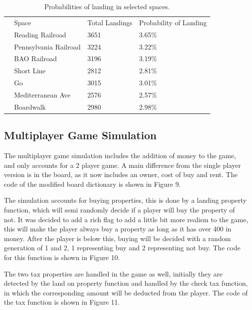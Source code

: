 \documentclass[12pt, letter]{article}
\begin{document}
\begin{table}[]
\centering
\caption{Probabilities of landing in selected spaces. }
\label{my-label}
\begin{tabular}{llll}
 & Space                 & Total Landings & Probability of Landing \\
 & Reading Railroad      & 3651           & 3.65\%                 \\
 & Pennsylvania Railroad & 3224           & 3.22\%                 \\
 & BAO Railroad          & 3196           & 3.19\%                 \\
 & Short Line            & 2812           & 2.81\%                 \\
 & Go                    & 3015           & 3.01\%                 \\
 & Mediterranean Ave     & 2576           & 2.57\%                 \\
 & Boardwalk             & 2980           & 2.98\%                
\end{tabular}
\end{table}

\FloatBarrier

\subsection{Multiplayer Game Simulation}

The multiplayer game simulation includes the addition of money to the game, and only accounts for a 2 player game. A main difference from the single player version is in the board, as it now includes an owner,  cost of buy and rent. The code of the modified board dictionary is shown in Figure 9. 

The simulation accounts for buying properties, this is done by a landing property function, which will semi randomly decide if a player will buy the property of not. It was decided to add a rich flag to add a little bit more realism to the game, this will make the player always buy a property as long as it has over 400 in money. After the player is below this, buying will be decided with a random generation of 1 and 2, 1 representing buy and 2 representing not buy. The code for this function is shown in Figure 10.

The two tax properties are handled in the game as well, initially they are detected by the land on property function and handled by the check tax function, in which the corresponding amount will be deducted from the player. The code of the tax function is shown in Figure 11. 
\end{document}
